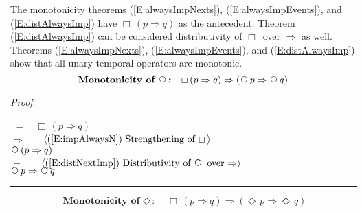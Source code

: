 \documentclass[12pt, fleqn, leqno]{article}
\newcommand{\lgap}{2pt}                             %
\newcommand{\mymathindent}{24pt}                    %
\newcommand{\impl}{\ensuremath{\Rightarrow}}        %
\newcommand{\Next}{\;\,\text{\raisebox{3.5pt}{\circle{6}}}}
\newcommand{\Event}{\Diamond\,}
\newcommand{\Always}{\Box\,}
\newcommand{\myqed}{\rule[-.23ex]{1.2ex}{2.0ex}}
\newcommand{\myqedtab}{\hspace{384pt}}              %
\newcommand{\Gll} {\langle}                         %
\newcommand{\Ggg} {\rangle}                         %
\newcommand{\Hint}[1]     {\ \ \ $\Gll              \mbox{#1} \Ggg$ }   %
\begin{document}
The monotonicity theorems (\ref{E:alwaysImpNexts}), (\ref{E:alwaysImpEvents}), and (\ref{E:distAlwaysImp}) have $\Always (p \impl q)$
as the antecedent.
Theorem (\ref{E:distAlwaysImp}) can be considered distributivity of $\Always$ over $\impl$ as well.
Theorems (\ref{E:alwaysImpNexts}), (\ref{E:alwaysImpEvents}), and (\ref{E:distAlwaysImp}) show that all unary temporal
operators are monotonic.
\begin{equation}\label{E:alwaysImpNexts}
\textbf{Monotonicity of $\Next$:}\quad \Always (p \impl q) \impl (\Next p \impl \Next q)
\end{equation}

\emph{Proof}:
\begin{tabbing}
\hspace{\mymathindent} \= $= \;$ \= \myqedtab \= \kill
  \> \>   $\Always (p \impl q)$\\[\lgap]
  \> $\impl$  \>  \Hint{(\ref{E:impAlwaysN}) Strengthening of $\Always$}\\[\lgap]
  \> \>   $\Next (p \impl q)$\\[\lgap]
  \> $=$  \>  \Hint{(\ref{E:distNextImp}) Distributivity of $\Next$ over $\impl$}\\[\lgap]
  \> \>   $\Next p \impl \Next q$ \quad \myqed
\end{tabbing}
\begin{equation}\label{E:alwaysImpEvents}
\textbf{Monotonicity of $\Event$:}\quad \Always (p \impl q) \impl (\Event p \impl \Event q)
\end{equation}
\end{document}
